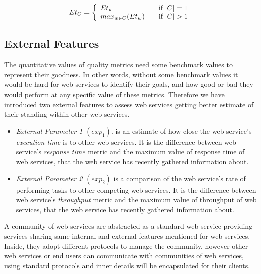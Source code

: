 \documentclass[10pt,journal,cspaper,compsoc]{IEEEtran}
\begin{document}
\begin{itemize}
	\begin{equation}
		Et_{C} = \left\{ 
			\begin{array}{l l}
				Et_{w} & \quad \text{if $|C| = 1$}\\
				max_{w \in C}{(Et_{w})} & \quad \text{if $|C| > 1$}
			\end{array} \right.
	\end{equation}
	
	
\end{itemize}


\subsection{External Features}\label{s:ef}

The quantitative values of quality metrics need some benchmark values to represent their goodness. In other words, without some benchmark values it would be hard for web services to identify their goals, and how good or bad they would perform at any specific value of these metrics. Therefore we have introduced two external features to assess web services getting better estimate of their standing within other web services.

\begin{itemize}
  \item \emph{External Parameter 1} $(exp_1)$. is an estimate of how close the web service's \emph{execution time} is to other web services. It is the difference between web service's \emph{response time} metric and the maximum value of response time of web services, that the web service has recently gathered information about.
	\item \emph{External Parameter 2} $(exp_2)$ is a comparison of the web service's rate of performing tasks to other competing web services. It is the difference between web service's \emph{throughput} metric and the maximum value of throughput of web services, that the web service has recently gathered information about.
\end{itemize}

A community of web services are abstracted as a standard web service providing services sharing same internal and external features mentioned for web services. Inside, they adopt different protocols to manage the community, however other web services or end users can communicate with communities of web services, using standard protocols and inner details will be encapsulated for their clients.
\end{document}

